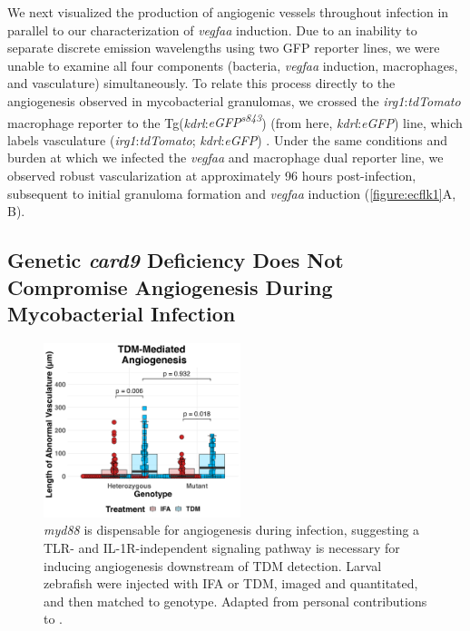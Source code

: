 We next visualized the production of angiogenic vessels throughout infection in parallel to our characterization of \textit{vegfaa} induction. Due to an inability to separate discrete emission wavelengths using two GFP reporter lines, we were unable to examine all four components (bacteria, \textit{vegfaa} induction, macrophages, and vasculature) simultaneously. To relate this process directly to the angiogenesis observed in mycobacterial granulomas, we crossed the \textit{irg1}:\textit{tdTomato} macrophage reporter to the Tg(\textit{kdrl}:\textit{eGFP\textsuperscript{s843}}) (from here, \textit{kdrl}:\textit{eGFP}) line, which labels vasculature (\textit{irg1}:\textit{tdTomato}; \textit{kdrl}:\textit{eGFP}) \citep{Jin2005}. Under the same conditions and burden at which we infected the \textit{vegfaa} and macrophage dual reporter line, we observed robust vascularization at approximately 96 hours post-infection, subsequent to initial granuloma formation and \textit{vegfaa} induction (\autoref{figure:ecflk1}A, B). 

\subsection{Genetic \textit{card9} Deficiency Does Not Compromise Angiogenesis During Mycobacterial Infection}

\begin{figure}
\centering
\includegraphics[height=2in]{images/JB96_myd88_TDM_103022.png}
\caption{\textit{myd88} is dispensable for angiogenesis during infection, suggesting a TLR- and IL-1R-independent signaling pathway is necessary for inducing angiogenesis downstream of TDM detection. Larval zebrafish were injected with IFA or TDM, imaged and quantitated, and then matched to genotype. Adapted from personal contributions to \citet{Walton2018}.}
\label{figure:myd88}

\end{figure}

